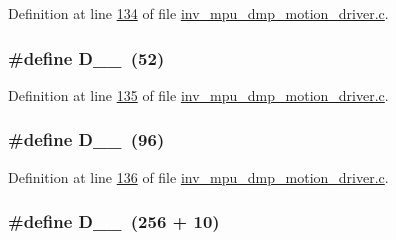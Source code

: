 Definition at line \hyperlink{inv__mpu__dmp__motion__driver_8c_source_l00134}{134} of file \hyperlink{inv__mpu__dmp__motion__driver_8c_source}{inv\+\_\+mpu\+\_\+dmp\+\_\+motion\+\_\+driver.\+c}.

\subsubsection[{\texorpdfstring{D\+\_\+0\+\_\+52}{D_0_52}}]{\setlength{\rightskip}{0pt plus 5cm}\#define D\+\_\+\_~(52)}\hypertarget{group___d_r_i_v_e_r_s_gaa3d478603bf46f77a6eb95f2c71ee48e}{}\label{group___d_r_i_v_e_r_s_gaa3d478603bf46f77a6eb95f2c71ee48e}


Definition at line \hyperlink{inv__mpu__dmp__motion__driver_8c_source_l00135}{135} of file \hyperlink{inv__mpu__dmp__motion__driver_8c_source}{inv\+\_\+mpu\+\_\+dmp\+\_\+motion\+\_\+driver.\+c}.

\subsubsection[{\texorpdfstring{D\+\_\+0\+\_\+96}{D_0_96}}]{\setlength{\rightskip}{0pt plus 5cm}\#define D\+\_\+\_~(96)}\hypertarget{group___d_r_i_v_e_r_s_ga7e992a46da86f1d053f9ef5fc2e53b7a}{}\label{group___d_r_i_v_e_r_s_ga7e992a46da86f1d053f9ef5fc2e53b7a}


Definition at line \hyperlink{inv__mpu__dmp__motion__driver_8c_source_l00136}{136} of file \hyperlink{inv__mpu__dmp__motion__driver_8c_source}{inv\+\_\+mpu\+\_\+dmp\+\_\+motion\+\_\+driver.\+c}.

\subsubsection[{\texorpdfstring{D\+\_\+1\+\_\+10}{D_1_10}}]{\setlength{\rightskip}{0pt plus 5cm}\#define D\+\_\+\_~(256 + 10)}\hypertarget{group___d_r_i_v_e_r_s_ga6b208218857c2067078082e832148f61}{}\label{group___d_r_i_v_e_r_s_ga6b208218857c2067078082e832148f61}


